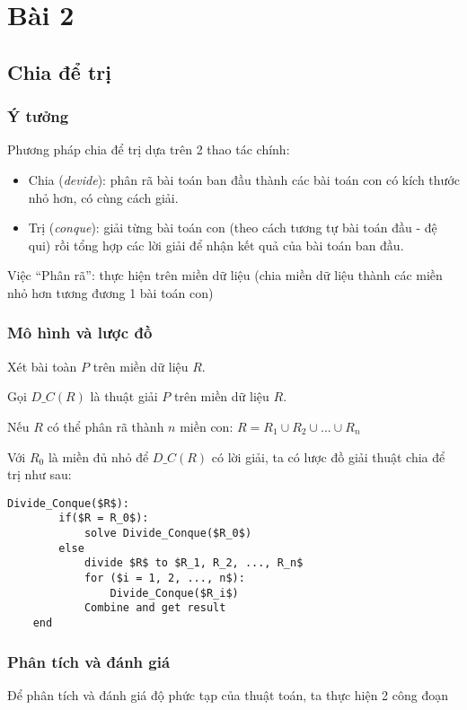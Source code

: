 \section{Bài 2}

\subsection{Chia để trị}

\subsubsection{Ý tưởng}
Phương pháp chia để trị dựa trên 2 thao tác chính:
\begin{itemize}
    \item Chia (\textit{devide}): phân rã bài toán ban đầu thành các bài toán con có kích thước
    nhỏ hơn, có cùng cách giải.
    \item Trị (\textit{conque}): giải từng bài toán con (theo cách tương tự bài toán đầu - đệ
    qui) rồi tổng hợp các lời giải để nhận kết quả của bài toán ban đầu.
\end{itemize}

Việc “Phân rã”: thực hiện trên miền dữ liệu (chia miền dữ liệu thành các miền
nhỏ hơn tương đương 1 bài toán con)

\subsubsection{Mô hình và lược đồ}
Xét bài toàn $P$ trên miền dữ liệu $R$.

Gọi $D\_C(R)$ là thuật giải $P$ trên miền dữ liệu $R$.

Nếu $R$ có thể phân rã thành $n$ miền con: $R = R_1 \cup R_2 \cup ... \cup R_n$

Với $R_0$ là miền đủ nhỏ để  $D\_C(R)$ có lời giải, ta có lược đồ giải thuật chia để trị như sau:

\begin{lstlisting}[style=algo]
    Divide_Conque($R$):
        if($R = R_0$):
            solve Divide_Conque($R_0$)
        else
            divide $R$ to $R_1, R_2, ..., R_n$
            for ($i = 1, 2, ..., n$):
                Divide_Conque($R_i$)
            Combine and get result
    end
\end{lstlisting}

\subsubsection{Phân tích và đánh giá}
Để phân tích và đánh giá độ phức tạp của thuật toán, ta thực hiện 2 công đoạn

